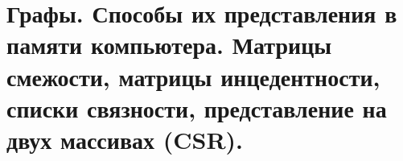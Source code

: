 \section{Графы. Способы их представления в памяти компьютера. Матрицы смежости, матрицы инцедентности, списки связности, представление на двух массивах (CSR).}